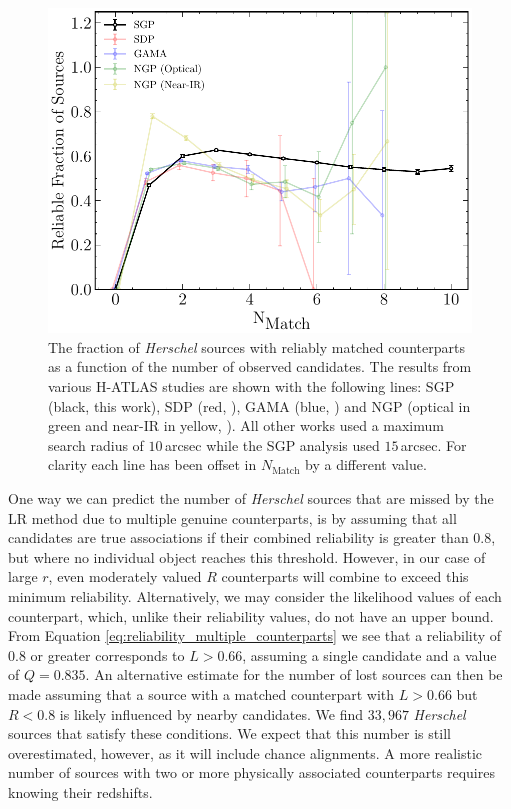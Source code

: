 \begin{figure}
    \centering
    \includegraphics[width=0.67\columnwidth]{Figures/multiplicity.pdf}
    \caption[Reliable fraction of sources as a function of the number of candidates]{The fraction of \textit{Herschel} sources with reliably matched counterparts as a function of the number of observed candidates. The results from various H-ATLAS studies are shown with the following lines: SGP (black, this work), SDP (red, \citealt{Smith_2011}), GAMA (blue, \citealt{Bourne_2016}) and NGP (optical in green and near-IR in yellow, \citealt{Furlanetto_2018}). All other works used a maximum search radius of $10\,$arcsec while the SGP analysis used $15\,$arcsec. For clarity each line has been offset in $N_{\textrm{Match}}$ by a different value.}
    \label{fig:multiplicity}
\end{figure}

One way we can predict the number of \textit{Herschel} sources that are missed by the LR method due to multiple genuine counterparts, is by assuming that all candidates are true associations if their combined reliability is greater than $0.8$, but where no individual object reaches this threshold. However, in our case of large $r$, even moderately valued $R$ counterparts will combine to exceed this minimum reliability. Alternatively, we may consider the likelihood values of each counterpart, which, unlike their reliability values, do not have an upper bound. From Equation \ref{eq:reliability_multiple_counterparts} we see that a reliability of $0.8$ or greater corresponds to $L > 0.66$, assuming a single candidate and a value of $Q = 0.835$. An alternative estimate for the number of lost sources can then be made assuming that a source with a matched counterpart with $L > 0.66$ but $R < 0.8$ is likely influenced by nearby candidates. We find $33,967$ \textit{Herschel} sources that satisfy these conditions. We expect that this number is still overestimated, however, as it will include chance alignments. A more realistic number of sources with two or more physically associated counterparts requires knowing their redshifts.

